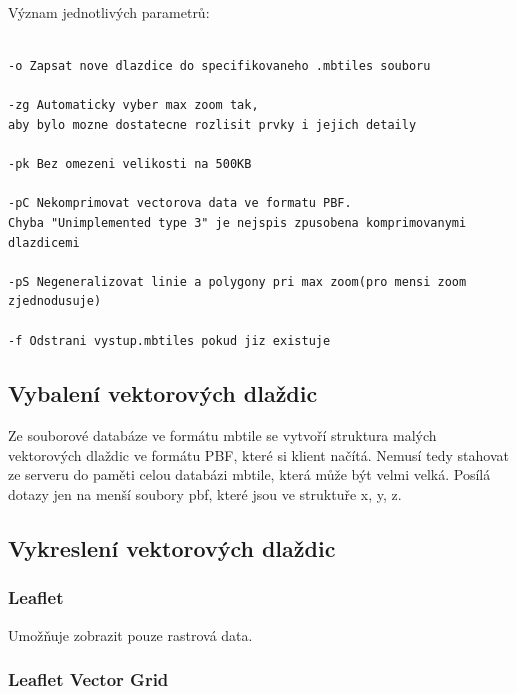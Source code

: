 \documentclass[12pt]{article}
\begin{document}
\vspace{0.5cm}
Význam jednotlivých parametrů:
\begin{lstlisting}

-o Zapsat nove dlazdice do specifikovaneho .mbtiles souboru

-zg Automaticky vyber max zoom tak,
aby bylo mozne dostatecne rozlisit prvky i jejich detaily

-pk Bez omezeni velikosti na 500KB

-pC Nekomprimovat vectorova data ve formatu PBF.
Chyba "Unimplemented type 3" je nejspis zpusobena komprimovanymi dlazdicemi

-pS Negeneralizovat linie a polygony pri max zoom(pro mensi zoom zjednodusuje)

-f Odstrani vystup.mbtiles pokud jiz existuje
\end{lstlisting}


\subsection{Vybalení vektorových dlaždic}
Ze souborové databáze ve formátu mbtile se vytvoří struktura malých vektorových dlaždic ve formátu PBF, které si klient načítá. Nemusí tedy stahovat ze serveru do paměti celou databázi mbtile, která může být velmi velká. Posílá dotazy jen na menší soubory pbf, které jsou ve struktuře x, y, z.

\subsection{Vykreslení vektorových dlaždic}

\subsubsection{Leaflet}
Umožňuje zobrazit pouze rastrová data.

\subsubsection{Leaflet Vector Grid}


\end{document}
